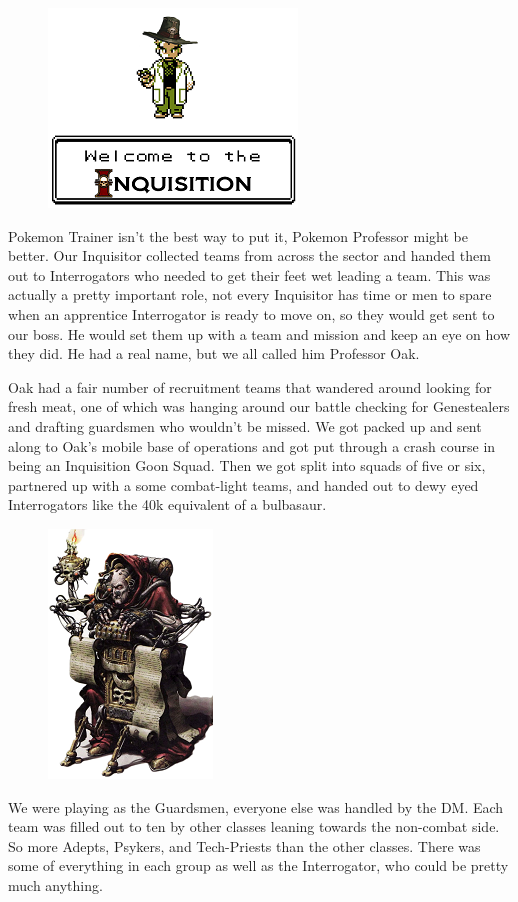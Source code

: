 \begin{figure}
	\begin{center}
		\includegraphics[width=\figwidth]{pics/2/2.png}
	\end{center}
\end{figure}
Pokemon Trainer isn't the best way to put it, Pokemon Professor might be better.
Our Inquisitor collected teams from across the sector and handed them out to Interrogators who needed to get their feet wet leading a team. 
This was actually a pretty important role, not every Inquisitor has time or men to spare when an apprentice Interrogator is ready to move on, so they would get sent to our boss. 
He would set them up with a team and mission and keep an eye on how they did. 
He had a real name, but we all called him Professor Oak.

Oak had a fair number of recruitment teams that wandered around looking for fresh meat, one of which was hanging around our battle checking for Genestealers and drafting guardsmen who wouldn't be missed. %
We got packed up and sent along to Oak's mobile base of operations and got put through a crash course in being an Inquisition Goon Squad.
Then we got split into squads of five or six, partnered up with a some combat-light teams, and handed out to dewy eyed Interrogators like the 40k equivalent of a bulbasaur.


\begin{figure}
	\begin{center}
		\includegraphics[width=\figwidth]{pics/2/3.png}
	\end{center}
\end{figure}
We were playing as the Guardsmen, everyone else was handled by the DM. 
Each team  was filled out to ten by other classes leaning towards the non-combat side. 
So more Adepts, Psykers, and Tech-Priests than the other classes.
There was some of everything in each group as well as the Interrogator, who could be pretty much anything. 

